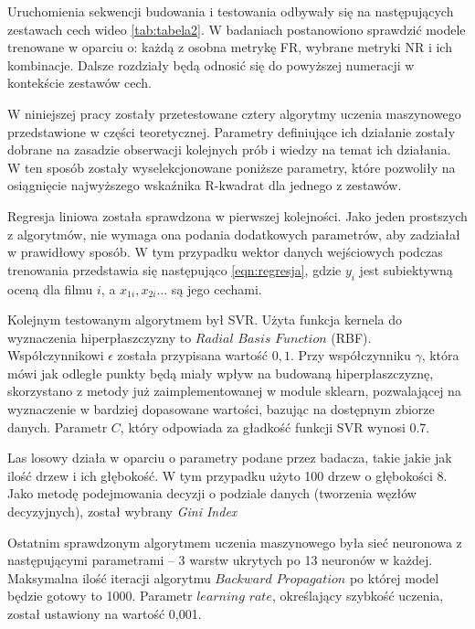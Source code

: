 Uruchomienia sekwencji budowania i testowania odbywały się na następujących zestawach cech wideo \ref{tab:tabela2}. W badaniach postanowiono sprawdzić  modele trenowane w oparciu o: każdą z osobna metrykę FR, wybrane metryki NR i ich kombinacje. Dalsze rozdziały będą odnosić się do powyższej numeracji w kontekście zestawów cech.





W niniejszej pracy zostały przetestowane cztery algorytmy uczenia maszynowego przedstawione w części teoretycznej. Parametry definiujące ich działanie zostały dobrane na zasadzie obserwacji kolejnych prób i wiedzy na temat ich działania. W ten sposób zostały wyselekcjonowane poniższe parametry, które pozwoliły na osiągnięcie najwyższego wskaźnika R-kwadrat dla jednego z zestawów.  \par

Regresja liniowa została sprawdzona w pierwszej kolejności. Jako jeden prostszych z algorytmów, nie wymaga ona podania dodatkowych parametrów, aby zadziałał w prawidłowy sposób. W tym przypadku wektor danych wejściowych podczas trenowania przedstawia się  następująco \ref{eqn:regresja}, gdzie $y_i$ jest subiektywną oceną dla filmu $i$, a $x_{1i}, x_{2i}...$ są jego cechami. \par

Kolejnym testowanym algorytmem był SVR. Użyta funkcja kernela do wyznaczenia hiperpłaszczyzny to $Radial$ $Basis$ $Function$ (RBF). Współczynnikowi $\epsilon$ została przypisana wartość $0,1$. Przy współczynniku $\gamma$, która mówi jak odległe punkty będą miały wpływ na budowaną hiperpłaszczyznę, skorzystano z metody już zaimplementowanej w module sklearn, pozwalającej na wyznaczenie w bardziej dopasowane wartości, bazując na dostępnym zbiorze danych. Parametr $C$, który odpowiada za gładkość funkcji SVR wynosi 0.7.\par

Las losowy działa w oparciu o parametry podane przez badacza, takie jakie jak ilość drzew i ich głębokość. W tym przypadku użyto 100 drzew o głębokości 8. Jako metodę podejmowania decyzji o podziale danych (tworzenia węzłów decyzyjnych), został wybrany \emph{Gini Index} \par

Ostatnim sprawdzonym algorytmem uczenia maszynowego była sieć neuronowa z następującymi parametrami -- 3 warstw ukrytych po 13 neuronów w każdej. Maksymalna ilość iteracji algorytmu $Backward$ $Propagation$ po której model będzie gotowy to 1000. Parametr $learning$ $rate$, określający szybkość uczenia, został ustawiony na wartość 0,001.\par



